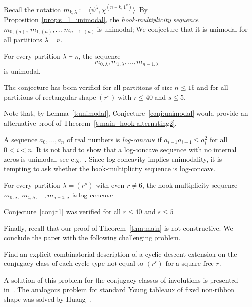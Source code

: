\documentclass[ALCO,published]{cedram}
\begin{document}
Recall the notation $m_{k,\lambda}:= \langle 
\psi^{\lambda},\chi^{(n-k,1^k)} \rangle$. 
By Proposition~\ref{prop:s=1_unimodal}, the \emph{hook-multiplicity sequence} $m_{0,(n)},\,m_{1,(n)},\ldots, m_{n-1,(n)}$ is unimodal; 
We conjecture that it is unimodal for all partitions $\lambda\vdash n$.  

\begin{conjecture}\label{conj:unimodal}
    For every partition $\lambda \vdash n$, the sequence
    \[
        m_{0,\lambda},m_{1,\lambda},\ldots,m_{n-1,\lambda}
    \]
    is unimodal.
\end{conjecture}
    
The conjecture has been verified for all partitions of size $n \le 15$ and for all partitions of rectangular shape $(r^s)$ with $r \le 40$ and $s \le 5$.   
    
Note that, by Lemma~\ref{t:unimodal}, Conjecture~\ref{conj:unimodal} would provide an alternative proof of Theorem~\ref{t:main_hook-alternating2}. 
  
A sequence $a_0,\ldots,a_n$ of real numbers is 
\emph{log-concave} if  $a_{i-1}a_{i+1}\le a_i^2$ for all  $0<i<n$. 
It is not hard to show that a log-concave sequence with no internal zeros is unimodal, see e.g.~\cite{Brenti, Stanley}.
Since log-concavity implies unimodality, it is tempting to ask whether the hook-multiplicity sequence is log-concave.

\begin{conjecture}\label{conj:r1}
For every partition $\lambda=(r^s)$ with even $r\ne 6$,
the hook-multiplicity sequence $m_{0,\lambda},\,m_{1,\lambda},\ldots, m_{n-1,\lambda}$ is log-concave.
\end{conjecture}

Conjecture~\ref{conj:r1} 
was verified for all $r\leq 40$ and $s\leq 5$. 

Finally, recall that our proof of Theorem~\ref{thm:main} is not constructive. 
We conclude the paper with the following challenging 
problem.

\begin{problem} 
    Find 
    an explicit combinatorial description of a cyclic descent extension on the conjugacy class of each cycle type not equal to $(r^s)$ for a square-free $r$.
\end{problem}

A solution of this problem for the conjugacy classes of involutions 
is presented in~\cite{Adin-R23}. The analogous problem for standard Young tableaux of fixed non-ribbon shape was solved by Huang~\cite{Huang}. 





\end{document}
